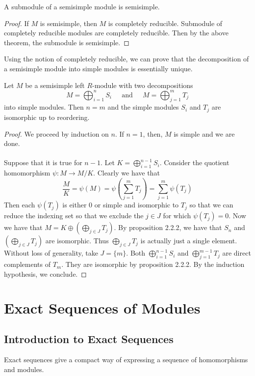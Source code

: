 \documentclass[a4paper]{article}
\begin{document}
\begin{crl}{}{} A submodule of a semisimple module is semisimple. \tcbline
\begin{proof}
If $M$ is semisimple, then $M$ is completely reducible. Submodule of completely reducible modules are completely reducible. Then by the above theorem, the submodule is semisimple. 
\end{proof}
\end{crl}

Using the notion of completely reducible, we can prove that the decomposition of a semisimple module into simple modules is essentially unique. 

\begin{prp}{}{} Let $M$ be a semisimple left $R$-module with two decompositions $$M=\bigoplus_{i=1}^nS_i\;\;\;\;\text{ and }\;\;\;\; M=\bigoplus_{j=1}^mT_j$$ into simple modules. Then $n=m$ and the simple modules $S_i$ and $T_j$ are isomorphic up to reordering. \tcbline
\begin{proof}
We proceed by induction on $n$. If $n=1$, then, $M$ is simple and we are done. \\~\\

Suppose that it is true for $n-1$. Let $K=\bigoplus_{i=1}^{n-1}S_i$. Consider the quotient homomorphism $\psi:M\to M/K$. Clearly we have that $$\frac{M}{K}=\psi(M)=\psi\left(\sum_{j=1}^mT_j\right)=\sum_{j=1}^m\psi(T_j)$$ Then each $\psi(T_j)$ is either $0$ or simple and isomorphic to $T_j$ so that we can reduce the indexing set so that we exclude the $j\in J$ for which $\psi(T_j)=0$. Now we have that $M=K\oplus\left(\bigoplus_{j\in J}T_j\right)$. By proposition 2.2.2, we have that $S_n$ and $\left(\bigoplus_{j\in J}T_j\right)$ are isomorphic. Thus $\bigoplus_{j\in J}T_j$ is actually just a single element. Without loss of generality, take $J=\{m\}$. Both $\bigoplus_{i=1}^{n-1}S_i$ and $\bigoplus_{j=1}^{m-1}T_j$ are direct complements of $T_m$. They are isomorphic by proposition 2.2.2. By the induction hypothesis, we conclude. 
\end{proof}
\end{prp}

\pagebreak
\section{Exact Sequences of Modules}
\subsection{Introduction to Exact Sequences}
Exact sequences give a compact way of expressing a sequence of homomorphisms and modules. 
\end{document}
